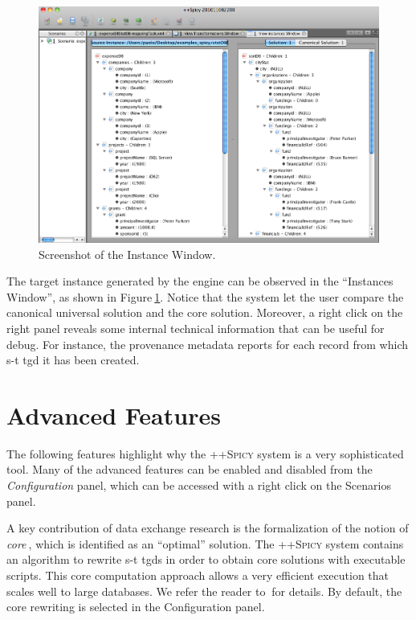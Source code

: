 \documentclass[12pt]{article}
\newcommand{\spicypp}{\textsc{++Spicy}}
\newcommand{\tld}{$~$}
\newcommand{\quotes}[1]{``#1''}
\newcommand{\removespace}{\vspace*{-0.35cm}}
\newcommand{\removelargespace}{\vspace*{-0.7cm}}
\begin{document}
\begin{figure}[htb]
\removespace
\begin{center}
\includegraphics[width=\columnwidth]{images/instance.png}
\removespace
\caption{\small Screenshot of the Instance Window.} \label{fig:instance}
\end{center}
\removelargespace
\end{figure}

The target instance generated by the engine can be observed in the \quotes{Instances Window}, as shown in Figure\tld\ref{fig:instance}. Notice that the system let the user compare the canonical universal solution and the core solution. Moreover, a right click on the right panel reveals some internal technical information that can be useful for debug. For instance, the provenance metadata reports for each record from which s-t tgd it has been created.
 

\section{Advanced Features} \label{sec:advanced}

The following features highlight why the {\spicypp} system is a very sophisticated tool. Many of the advanced features can be enabled and disabled from the {\em Configuration} panel, which can be accessed with a right click on the Scenarios panel.

A key contribution of data exchange research is the formalization of the notion of \textit{core}\tld\cite{Fagin2005b}, which is identified as an \quotes{optimal} solution. 
The {\spicypp} system contains an algorithm to rewrite s-t tgds in order to obtain core solutions with executable scripts. This core computation approach allows a very efficient execution that scales well to large databases. We refer the reader to\tld\cite{Mecca2009, Mecca2011TR} for details. By default, the core rewriting is selected in the Configuration panel.
\end{document}
